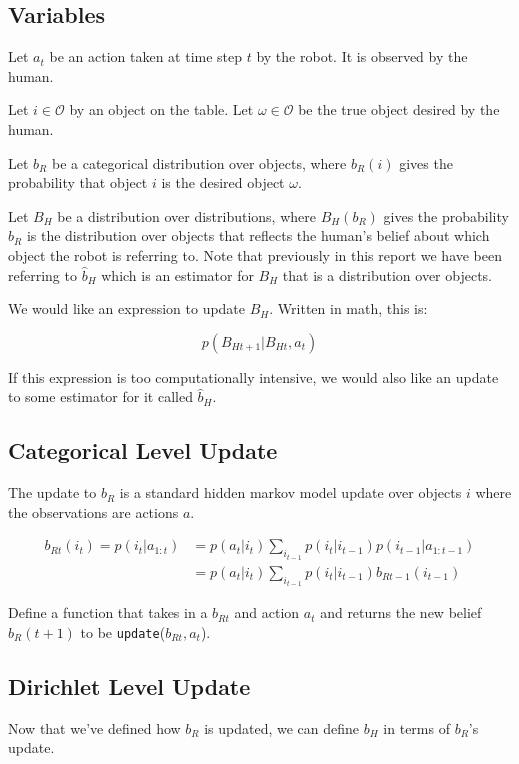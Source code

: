 \documentclass{article}
\begin{document}
\subsection{Variables}

Let $a_t$ be an action taken at time step $t$ by the robot. It is observed by the human. 

Let $i \in \mathcal{O}$ by an object on the table. Let $\omega \in \mathcal{O}$ be the true object desired by the human. 

Let $b_R$ be a categorical distribution over objects, where $b_R(i)$ gives the probability that object $i$ is the desired object $\omega$. 

Let $B_H$ be a distribution over distributions, where $B_H(b_R)$ gives the probability $b_R$ is the distribution over objects that reflects the human's belief about which object the robot is referring to. Note that previously in this report we have been referring to $\hat b_H$ which is an estimator for $B_H$ that is a distribution over objects. 

We would like an expression to update $B_H$. 
Written in math, this is: 

$$p(B_{Ht+1} |  B_{Ht}, a_t)$$

If this expression is too computationally intensive, we would also like an update to some estimator for it called $\hat b_H$. 


\subsection{Categorical Level Update} 

The update to $b_R$ is a standard hidden markov model update over objects $i$ where the observations are actions $a$. 

\begin{align} 
	b_{Rt}(i_{t}) = p(i_{t}|a_{1:t}) &= p(a_t |i_t) \sum_{i_{t-1}} p(i_{t}|i_{t-1})  p(i_{t-1} | a_{1:t-1}) \\ 
	&= p(a_t |i_t) \sum_{i_{t-1}} p(i_{t}|i_{t-1}) b_{Rt-1}(i_{t-1}) 
\end{align}

Define a function that takes in a $b_{Rt}$ and action $a_t$ and returns the new belief $b_R(t+1)$ to be \texttt{update}($b_{Rt}, a_t$). 


\subsection{Dirichlet Level Update}

Now that we've defined how $b_R$ is updated, we can define $b_H$ in terms of $b_R$'s update. 
\end{document}

